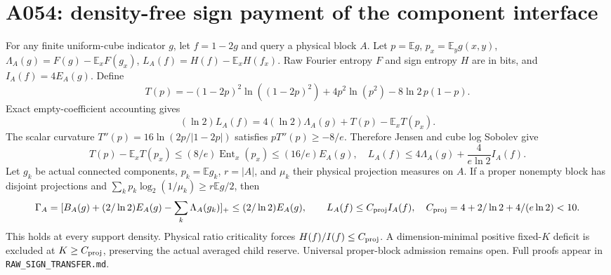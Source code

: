\documentclass{article}
\begin{document}
\section*{A054: density-free sign payment of the component interface}
For any finite uniform-cube indicator $g$, let $f=1-2g$ and query a
physical block $A$. Let $p=\mathbb Eg$, $p_x=\mathbb E_y g(x,y)$,
$\Lambda_A(g)=F(g)-\mathbb E_xF(g_x)$, $L_A(f)=H(f)-\mathbb E_xH(f_x)$.
Raw Fourier entropy $F$ and sign entropy $H$ are in bits, and
$I_A(f)=4E_A(g)$. Define
\[
T(p)=-(1-2p)^2\ln((1-2p)^2)+4p^2\ln(p^2)-8\ln2\,p(1-p).
\]
Exact empty-coefficient accounting gives
\[
(\ln2)L_A(f)=4(\ln2)\Lambda_A(g)+T(p)-\mathbb E_xT(p_x).
\]
The scalar curvature $T''(p)=16\ln(2p/|1-2p|)$ satisfies
$pT''(p)\ge-8/e$. Therefore Jensen and cube log Sobolev give
\[
T(p)-\mathbb E_xT(p_x)\le(8/e)\operatorname{Ent}_x(p_x)
\le(16/e)E_A(g),
\quad L_A(f)\le4\Lambda_A(g)+\frac4{e\ln2}I_A(f).
\]
Let $g_k$ be actual connected components, $p_k=\mathbb Eg_k$, $r=|A|$,
and $\mu_k$ their physical projection measures on $A$.
If a proper nonempty block has disjoint projections and
$\sum_kp_k\log_2(1/\mu_k)\ge r\mathbb Eg/2$, then
\[
\Gamma_A=[B_A(g)+(2/\ln2)E_A(g)-\sum_k\Lambda_A(g_k)]_+
\le(2/\ln2)E_A(g),\qquad
L_A(f)\le C_{\rm proj}I_A(f),\quad
C_{\rm proj}=4+2/\ln2+4/(e\ln2)<10.
\]
This holds at every support density. Physical ratio criticality forces
$H(f)/I(f)\le C_{\rm proj}$. A dimension-minimal positive fixed-$K$
deficit is excluded at $K\ge C_{\rm proj}$, preserving the actual
averaged child reserve. Universal proper-block admission remains open.
Full proofs appear in \texttt{RAW\_SIGN\_TRANSFER.md}.
\end{document}

